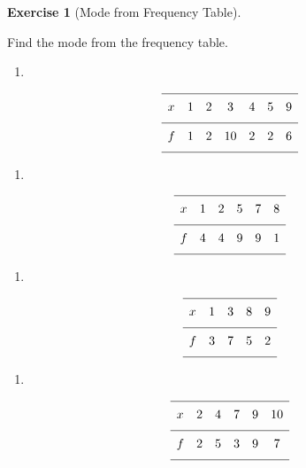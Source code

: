 \documentclass[
  letterpaper,
  DIV=11,
  numbers=noendperiod]{scrreprt}
\providecommand{\tightlist}{%
  \setlength{\itemsep}{0pt}\setlength{\parskip}{0pt}}
\theoremstyle{definition}
\newtheorem{exercise}{Exercise}[chapter]
\theoremstyle{remark}
\begin{document}
\begin{exercise}[Mode from Frequency
Table]\protect\hypertarget{exr-freq-3}{}\label{exr-freq-3}

Find the mode from the frequency table.

\begin{enumerate}
\def\labelenumi{\alph{enumi})}
\tightlist
\item
\end{enumerate}

\[{\renewcommand{\arraystretch}{1.6}\begin{array}{lcccccc}
\hline x & 1 & 2 & 3 & 4 & 5 & 9 \\[4pt]
\hline f & 1 & 2 & 10 & 2 & 2 & 6 \\[4pt]
\hline
\end{array}}\]

\begin{enumerate}
\def\labelenumi{\alph{enumi})}
\setcounter{enumi}{1}
\tightlist
\item
\end{enumerate}

\[{\renewcommand{\arraystretch}{1.6}\begin{array}{lccccc}
\hline x & 1 & 2 & 5 & 7 & 8 \\[4pt]
\hline f & 4 & 4 & 9 & 9 & 1 \\[4pt]
\hline
\end{array}}\]

\begin{enumerate}
\def\labelenumi{\alph{enumi})}
\setcounter{enumi}{2}
\tightlist
\item
\end{enumerate}

\[{\renewcommand{\arraystretch}{1.6}\begin{array}{lcccc}
\hline x & 1 & 3 & 8 & 9 \\[4pt]
\hline f & 3 & 7 & 5 & 2 \\[4pt]
\hline
\end{array}}\]

\begin{enumerate}
\def\labelenumi{\alph{enumi})}
\setcounter{enumi}{3}
\tightlist
\item
\end{enumerate}

\[{\renewcommand{\arraystretch}{1.6}\begin{array}{lccccc}
\hline x & 2 & 4 & 7 & 9 & 10 \\[4pt]
\hline f & 2 & 5 & 3 & 9 & 7 \\[4pt]
\hline
\end{array}}\]


\end{exercise}
\end{document}
